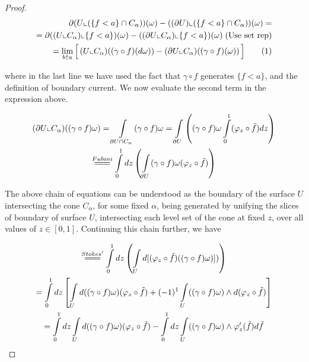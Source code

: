 \documentclass[10pt,a4paper]{amsart}
\newcommand\numberthis{\addtocounter{equation}{1}\tag{\theequation}}
\begin{document}
\begin{proof}

    \begin{align*}
        \partial(U \llcorner (\{f < a\} \cap C_{\alpha}))(\omega) - ((\partial U) \llcorner (\{f < a\} \cap C_{\alpha}))(\omega) = \\
        = \partial((U \llcorner C_{\alpha}) \llcorner \{f < a \})(\omega) - ((\partial U \llcorner C_{\alpha}) \llcorner \{f < a \})(\omega) \; \text{(Use set rep)} \\
        = \lim\limits_{b \uparrow a} \Big[ \left( U \llcorner C_{\alpha})(( \gamma \circ f )(d\omega)) - (\partial U \llcorner C_{\alpha})(( \gamma \circ f )(\omega)\right) \Big] \label{eqn: bound_cur} \numberthis \\
    \end{align*}
    
    where in the last line we have used the fact that $\gamma \circ f$ generates $\{f < a\}$, and the definition of boundary current. We now evaluate the second term in the expression above.
    
    \begin{gather*}
        (\partial U \llcorner C_{\alpha})((\gamma \circ f)\omega) = \int\limits_{\partial U \cap C_{\alpha}}(\gamma \circ f)\omega = \int\limits_{\partial U}\left( (\gamma \circ f)\omega \int\limits_{0}^{1}(\varphi_z \circ \tilde{f})dz  \right) \\ \stackrel{Fubini}{=\joinrel=\joinrel=} \int\limits_{0}^{1} dz \left( \int\limits_{\partial U}(\gamma \circ f)\omega (\varphi_z \circ \tilde{f})  \right)
    \end{gather*}
    
    The above chain of equations can be understood as the boundary of the surface $U$ intersecting the cone $C_{\alpha}$, for some fixed $\alpha$, being generated by unifying the slices of boundary of surface $U$, intersecting each level set of the cone at fixed $z$, over all values of $z \in [0,1]$. Continuing this chain further, we have
    
    \begin{gather*}
        \stackrel{Stokes'}{=\joinrel=\joinrel=} \int\limits_{0}^{1} dz\left( \int\limits_{U} d[(\varphi_z \circ \tilde{f})((\gamma \circ f)\omega)]) \right) \\ 
        = \int\limits_{0}^{1}dz \left[ \int\limits_{U}d((\gamma \circ f)\omega) (\varphi_z \circ \tilde{f}) + (-1)^1 \int\limits_{U}((\gamma \circ f)\omega) \wedge d(\varphi_z \circ \tilde{f}) \right] \\ 
        = \int\limits_{0}^{1} dz\int\limits_{U}d((\gamma \circ f)\omega) (\varphi_z \circ \tilde{f}) - \int\limits_{0}^{1} dz\int\limits_{U} ((\gamma \circ f)\omega) \wedge \varphi_{z}'(\tilde{f})d\tilde{f}
    \end{gather*}
    

\end{proof}
\end{document}
